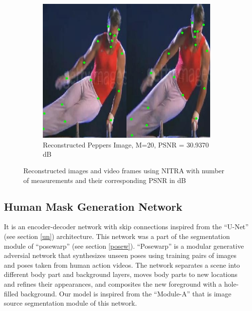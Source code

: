 \documentclass[conference]{IEEEtran}
\begin{document}
\begin{figure}[htbp]{}
\begin{subfigure}[t]{2cm}
\includegraphics[width=\linewidth, height=1.2\linewidth]{dm1}
\caption{Reconstructed Peppers Image, M=20, PSNR = 30.9370 dB} 
\label{caro3}
\end{subfigure}
\caption{Reconstructed images and video frames using NITRA with 
number of measurements and their corresponding PSNR in dB}
\label{NITRAres1} 
\end{figure}

\subsection{Human Mask Generation Network}
It is an encoder-decoder network with skip connections inspired from the ``U-Net'' (see section \ref{un}) architecture. This network was a part of the segmentation module of ``posewarp'' (see section \ref{posew}). ``Posewarp'' is a modular generative adversial network that synthesizes unseen poses using training pairs of images and poses taken from human action videos. The network separates a scene into different body part and background layers, moves body parts to new locations and refines their appearances, and composites the new foreground with a hole-filled background. Our model is inspired from the ``Module-A'' that is image source segmentation module of this network.
\end{document}
